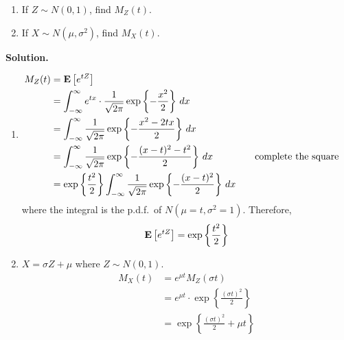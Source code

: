 \begin{Example}{}{}
    \begin{enumerate}[label=(\roman*)]
        \item If $ Z \sim N(0,1) $, find $ M_Z(t) $.
        \item If $ X \sim N(\mu,\sigma^2) $, find $ M_X(t) $.
    \end{enumerate}
    \textbf{Solution.}
    \begin{enumerate}[label=(\roman*)]
        \item \begin{align*}
                  M_Z(t)
                                                                     & =\bm{\mathrm{E}}\left[e^{tZ}\right]                                                                             \\
                                                                     & =\int_{-\infty}^{\infty} e^{tx}\cdot \frac{1}{\sqrt{2\pi}}
                  \exp\left\{ -\frac{x^2}{2} \right\} \, d{x}                                                                                                  \\
                                                                     & =\int_{-\infty}^{\infty} \frac{1}{\sqrt{2\pi}}
                  \exp\left\{ -\frac{x^2-2tx}{2} \right\} \, d{x}                                                                                              \\
                                                                     & =\int_{-\infty}^{\infty} \frac{1}{\sqrt{2\pi}}
                  \exp\left\{ -\frac{(x-t)^2-t^2}{2}\right\} \, d{x} & \quad                                                      & \text{complete the square} \\
                                                                     & =\exp\left\{ \frac{t^2}{2}\right\}
                  \int_{-\infty}^{\infty} \frac{1}{\sqrt{2\pi}}
                  \exp\left\{ -\frac{(x-t)^2}{2} \right\} \, d{x}
              \end{align*}
              where the integral is the p.d.f.\ of $ N(\mu=t,\sigma^2=1) $. Therefore,
              \[ \bm{\mathrm{E}}\left[e^{tZ}\right]=\exp\left\{ \frac{t^2}{2}\right\} \]

        \item $ X=\sigma Z+\mu $ where $ Z \sim N(0,1) $.
              \begin{align*}
                  M_X(t)
                   & =e^{\mu t}M_Z(\sigma t)                                                  \\
                   & =e^{\mu t}\cdot \exp\left\{ \frac{\left( \sigma t \right)^2}{2} \right\} \\
                   & =\exp\left\{ \frac{(\sigma t)^2}{2} +\mu t\right\}
              \end{align*}
    \end{enumerate}
\end{Example}

